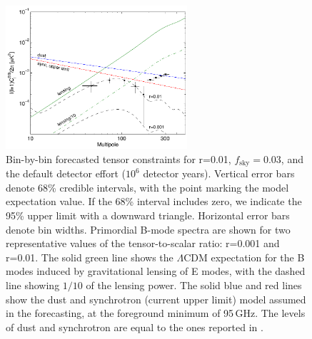\begin{figure}[h]
\centering
\includegraphics[width=0.6\textwidth]{Inflation/clBB_r01.pdf}
\caption{
Bin-by-bin forecasted tensor constraints for r=0.01, $f_\mathrm{sky} = 0.03$, 
and the default detector effort ($10^{6}$ detector years).
Vertical error bars denote 68\% credible intervals, with the point marking 
the model expectation value. If the 68\% interval includes zero, we indicate the 
95\% upper limit with a downward triangle. Horizontal error bars denote bin widths. 
Primordial B-mode spectra are shown for two representative values of the tensor-to-scalar ratio: r=0.001 and r=0.01.
The solid green line shows the
$\Lambda$CDM expectation for the B modes induced by gravitational lensing of E modes, 
with the dashed line showing $1/10$ of the lensing power. The
solid blue and red lines show the dust and synchrotron (current upper limit) model 
assumed in the forecasting, at the foreground minimum of 95\,GHz. The levels of dust
and synchrotron are equal to the ones reported in \cite{Array:2015xqh}.}
\label{fig_clBBr01}
\end{figure}

